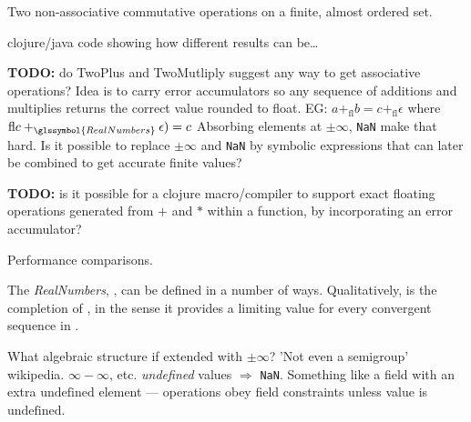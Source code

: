 Two non-associative commutative operations on a finite,
almost ordered set.
\begin{example}

clojure/java code showing how different results can be\ldots
 
\end{example}

\cite{Higham:2002:ASNA,Muller-et-al-2010,ZhuHayes:2010:ExactSummation}

\textbf{TODO:} do TwoPlus and TwoMutliply 
suggest any way to get associative operations?
Idea is to carry error accumulators so 
any sequence of additions and multiplies 
returns the correct  value rounded to float.
EG: $ a +_{\text{fl}} b = c +_{\text{fl}} \epsilon$
where $\text{fl} c +_{\glssymbol{RealNumbers}} \epsilon) = c$
Absorbing elements at $\pm\infty$, \texttt{NaN} make that hard.
Is it possible to replace $\pm\infty$ and \texttt{NaN}
by symbolic expressions that can later be combined to get 
accurate finite values?


\textbf{TODO:} is it possible for a clojure macro/compiler
to support exact floating operations generated from
$+$ and $*$ within a function, by incorporating an error
accumulator?
\label{sec:BigFraction}

Performance comparisons.

\label{sec:Real-numbers}

The \textit{\gls{RealNumbers}}, ,
can be defined in a number of ways. 
Qualitatively,  is the completion of
, 
in the sense it provides a limiting value for every
convergent sequence in .

What algebraic structure if extended with $\pm\infty$?
'Not even a semigroup' wikipedia.
$\infty - \infty$, etc. \textit{undefined} values $\Rightarrow$
\texttt{NaN}.
Something like a field with an extra $\text{undefined}$
element --- operations obey field constraints unless value is
$\text{undefined}$.

